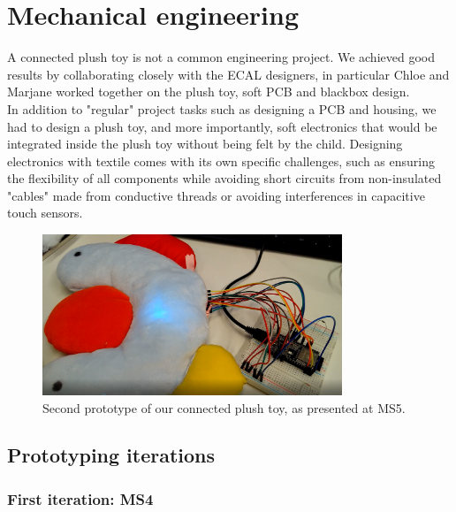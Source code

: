\newpage
\section{Mechanical engineering}
\label{sec:me}

A connected plush toy is not a common engineering project. We achieved good results by collaborating closely with the ECAL designers, in particular Chloe and Marjane worked together on the plush toy, soft PCB and blackbox design. \\
In addition to "regular" project tasks such as designing a PCB and housing, we had to design a plush toy, and more importantly, soft electronics that would be integrated inside the plush toy without being felt by the child. Designing electronics with textile comes with its own specific challenges, such as ensuring the flexibility of all components while avoiding short circuits from non-insulated "cables" made from conductive threads or avoiding interferences in capacitive touch sensors.  


\begin{figure}[ht]
    \centering
    \includegraphics[width=0.8\textwidth]{images/HW/proto2_soft.PNG}
    \caption{Second prototype of our connected plush toy, as presented at MS5.}
    \label{fig:proto2_kid}
\end{figure}

\subsection{Prototyping iterations}

\subsubsection{First iteration: MS4}

